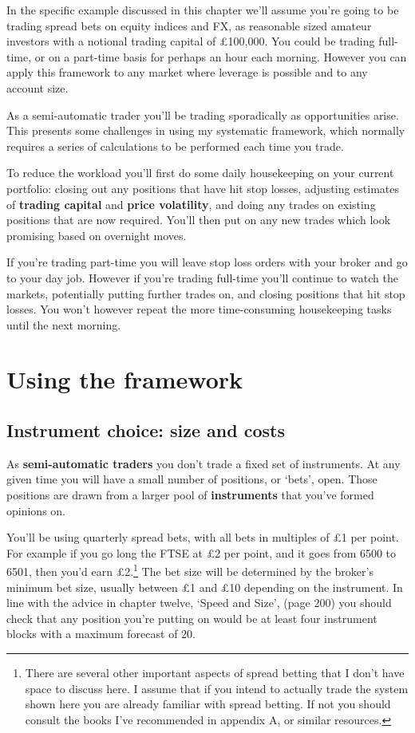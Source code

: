 In the specific example discussed in this chapter we'll assume you're going to be trading spread bets on equity indices and FX, as reasonable sized amateur investors with a notional trading capital of £100,000. You could be trading full-time, or on a part-time basis for perhaps an hour each morning. However you can apply this framework to any market where leverage is possible and to any account size.

As a semi-automatic trader you'll be trading sporadically as opportunities arise. This presents some challenges in using my systematic framework, which normally requires a series of calculations to be performed each time you trade.

To reduce the workload you'll first do some daily housekeeping on your current portfolio: closing out any positions that have hit stop losses, adjusting estimates of \textbf{trading capital} and \textbf{price volatility}, and doing any trades on existing positions that are now required. You'll then put on any new trades which look promising based on overnight moves.

If you're trading part-time you will leave stop loss orders with your broker and go to your day job. However if you're trading full-time you'll continue to watch the markets, potentially putting further trades on, and closing positions that hit stop losses. You won't however repeat the more time-consuming housekeeping tasks until the next morning.

\section*{Using the framework}  {}

\subsection*{Instrument choice: size and costs}

As \textbf{semi-automatic traders} you don't trade a fixed set of instruments. At any given time you will have a small number of positions, or ‘bets', open. Those positions are drawn from a larger pool of \textbf{instruments} that you've formed opinions on.

You'll be using quarterly spread bets, with all bets in multiples of £1 per point. For example if you go long the FTSE at £2 per point, and it goes from 6500 to 6501, then you'd earn £2.\footnote{There are several other important aspects of spread betting that I don't have space to discuss here. I assume that if you intend to actually trade the system shown here you are already familiar with spread betting. If not you should consult the books I've recommended in appendix A, or similar resources.} The bet size will be determined by the broker's minimum bet size, usually between £1 and £10 depending on the instrument. In line with the advice in chapter twelve, ‘Speed and Size', (page 200) you should check that any position you're putting on would be at least four instrument blocks with a maximum forecast of 20.

